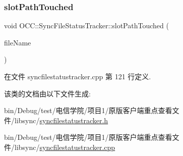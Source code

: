 \mbox{\label{class_o_c_c_1_1_sync_file_status_tracker_a4df2b8af03afa1d50e78a297f3e66be6}} 
\subsubsection{\texorpdfstring{slot\+Path\+Touched}{slotPathTouched}}
{\footnotesize\ttfamily void O\+C\+C\+::\+Sync\+File\+Status\+Tracker\+::slot\+Path\+Touched (\begin{DoxyParamCaption}\item[{const Q\+String \&}]{file\+Name }\end{DoxyParamCaption})\hspace{0.3cm}{\ttfamily [slot]}}



在文件 syncfilestatustracker.\+cpp 第 121 行定义.



该类的文档由以下文件生成\+:\begin{DoxyCompactItemize}
\item 
bin/\+Debug/test/电信学院/项目1/原版客户端重点查看文件/libsync/\hyperlink{syncfilestatustracker_8h}{syncfilestatustracker.\+h}\item 
bin/\+Debug/test/电信学院/项目1/原版客户端重点查看文件/libsync/\hyperlink{syncfilestatustracker_8cpp}{syncfilestatustracker.\+cpp}\end{DoxyCompactItemize}
